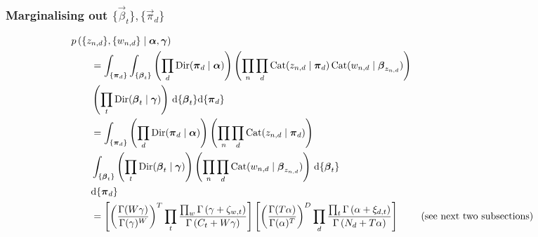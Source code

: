 \subsubsection{Marginalising out $\{\vec \beta_t\}, \{\vec \pi_d\}$}
\begin{align}
    \hspace{2em}&\hspace{-2em}
    p\left(\{z_{n, d}\}, \{w_{n, d}\} \given \vec \alpha, \vec \gamma\right) \nonumber\\
    &= \int_{\{\vec \pi_d\}} \int_{\{\vec \beta_t\}}
        \left(
            \prod_d \Dir(\vec \pi_d \given \vec \alpha)
        \right)
        \left(
            \prod_n \prod_d \Cat(z_{n, d} \given \vec \pi_d) \Cat(w_{n, d} \given \vec \beta_{z_{n, d}})
        \right) \nonumber\\
    &
        \left(
            \prod_t \Dir(\vec \beta_t \given \vec \gamma)
        \right)
    \,\mathrm d\{\vec \beta_t\}\mathrm d\{\vec \pi_d\}\nonumber\\
    &=
    \int_{\{\vec \pi_d\}}
        \left(
            \prod_d \Dir(\vec \pi_d \given \vec \alpha)
        \right)
        \left(
            \prod_n \prod_d \Cat(z_{n, d} \given \vec \pi_d)
        \right) \nonumber\\
    &
        \int_{\{\vec \beta_t\}}
            \left(
                \prod_t \Dir(\vec \beta_t \given \vec \gamma)
            \right)
            \left(
                \prod_n \prod_d \Cat(w_{n, d} \given \vec \beta_{z_{n, d}})
            \right)
            \,\mathrm d\{\vec \beta_t\} \nonumber\\
    &
    \mathrm d\{\vec \pi_d\} \nonumber\\
    &=
        \left[
            \left(
                \frac
                {
                    \Gamma(W \gamma)
                }
                {
                    \Gamma(\gamma)^W
                }
            \right)^T
            \prod_t
                \frac
                {
                    \prod_w \Gamma\left(\gamma + \zeta_{w, t}\right)
                }
                {
                    \Gamma\left(C_t + W\gamma\right)
                }
        \right]
        \left[
            \left(
                \frac
                {
                    \Gamma(T \alpha)
                }
                {
                    \Gamma(\alpha)^T
                }
            \right)^D
            \prod_d
                \frac
                {
                    \prod_t \Gamma\left(\alpha + \xi_{d, t}\right)
                }
                {
                    \Gamma\left(N_d + T \alpha\right)
                }
        \right] &&\text{(see next two subsections)}
\end{align}
